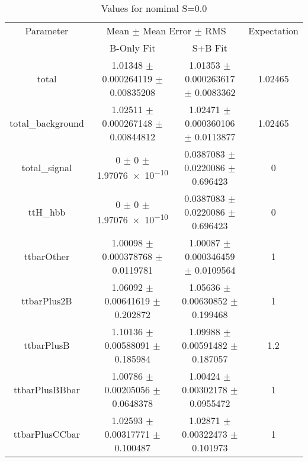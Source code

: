 \begin{table}
\centering
\caption{Values for nominal S=0.0}
\begin{tabular}{cccc}
\toprule
Parameter & \multicolumn{2}{c}{Mean $\pm$ Mean Error $\pm$ RMS} & Expectation\\
 & B-Only Fit & S+B Fit & \\
\midrule
total & \num{1.01348} $\pm$ \num{0.000264119} $\pm$ \num{0.00835208} & \num{1.01353} $\pm$ \num{0.000263617} $\pm$ \num{0.0083362} & \num{1.02465}\\
total\_background & \num{1.02511} $\pm$ \num{0.000267148} $\pm$ \num{0.00844812} & \num{1.02471} $\pm$ \num{0.000360106} $\pm$ \num{0.0113877} & \num{1.02465}\\
total\_signal & \num{0} $\pm$ \num{0} $\pm$ \num{1.97076e-10} & \num{0.0387083} $\pm$ \num{0.0220086} $\pm$ \num{0.696423} & \num{0}\\
ttH\_hbb & \num{0} $\pm$ \num{0} $\pm$ \num{1.97076e-10} & \num{0.0387083} $\pm$ \num{0.0220086} $\pm$ \num{0.696423} & \num{0}\\
ttbarOther & \num{1.00098} $\pm$ \num{0.000378768} $\pm$ \num{0.0119781} & \num{1.00087} $\pm$ \num{0.000346459} $\pm$ \num{0.0109564} & \num{1}\\
ttbarPlus2B & \num{1.06092} $\pm$ \num{0.00641619} $\pm$ \num{0.202872} & \num{1.05636} $\pm$ \num{0.00630852} $\pm$ \num{0.199468} & \num{1}\\
ttbarPlusB & \num{1.10136} $\pm$ \num{0.00588091} $\pm$ \num{0.185984} & \num{1.09988} $\pm$ \num{0.00591482} $\pm$ \num{0.187057} & \num{1.2}\\
ttbarPlusBBbar & \num{1.00786} $\pm$ \num{0.00205056} $\pm$ \num{0.0648378} & \num{1.00424} $\pm$ \num{0.00302178} $\pm$ \num{0.0955472} & \num{1}\\
ttbarPlusCCbar & \num{1.02593} $\pm$ \num{0.00317771} $\pm$ \num{0.100487} & \num{1.02871} $\pm$ \num{0.00322473} $\pm$ \num{0.101973} & \num{1}\\
\bottomrule
\end{tabular}
\end{table}